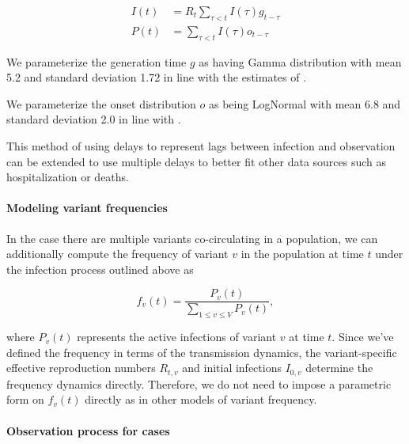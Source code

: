\documentclass[12pt]{article}
\begin{document}
\begin{align}
  I(t) &= R_{t} \sum_{\tau < t} I(\tau) g_{t-\tau}\\
  P(t) &= \sum_{\tau < t} I(\tau) o_{t-\tau}
\end{align}

We parameterize the generation time $g$ as having Gamma distribution with mean 5.2 and standard deviation 1.72 in line with the estimates of \cite{Ganyani2020}.

We parameterize the onset distribution $o$ as being LogNormal with mean 6.8 and standard deviation 2.0 in line with \cite{Cheng2021}.


This method of using delays to represent lags between infection and observation can be extended to use multiple delays to better fit other data sources such as hospitalization or deaths.

\paragraph{Modeling variant frequencies}%

In the case there are multiple variants co-circulating in a population, we can additionally compute the frequency of variant $v$ in the population at time $t$ under the infection process outlined above as

\begin{equation}
  f_{v}(t) = \frac{P_{v}(t)}{ \sum_{1\leq v \leq V} P_{v}(t)},
\end{equation}

where $P_{v}(t)$ represents the active infections of variant $v$ at time $t$.
Since we've defined the frequency in terms of the transmission dynamics, the variant-specific effective reproduction numbers $R_{t,v}$ and initial infections $I_{0, v}$ determine the frequency dynamics directly.
Therefore, we do not need to impose a parametric form on $f_{v}(t)$ directly as in other models of variant frequency.

\paragraph{Observation process for cases}%
\end{document}
